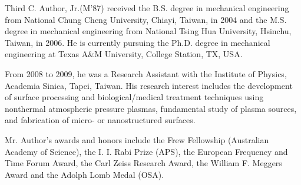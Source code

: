 \documentclass[journal]{IEEEtai}
\begin{document}
\begin{IEEEbiography}{Third C. Author, Jr.}{\space}(M’87) received the B.S. degree in mechanical engineering from National Chung Cheng University, Chiayi, Taiwan, in 2004 and the M.S. degree in mechanical engineering from National Tsing Hua University, Hsinchu, Taiwan, in 2006. He is currently pursuing the Ph.D. degree in mechanical engineering at Texas A\&M University, College Station, TX, USA.

    From 2008 to 2009, he was a Research Assistant with the Institute of Physics, Academia Sinica, Tapei, Taiwan. His research interest includes\vadjust{\vfill\pagebreak} the development of surface processing and biological/medical treatment techniques using nonthermal atmospheric pressure plasmas, fundamental study of plasma sources, and fabrication of micro- or nanostructured surfaces. 

   Mr. Author’s awards and honors include the Frew Fellowship (Australian Academy of Science), the I. I. Rabi Prize (APS), the European Frequency and Time Forum Award, the Carl Zeiss Research Award, the William F. Meggers Award and the Adolph Lomb Medal (OSA).
\end{IEEEbiography}
\end{document}
